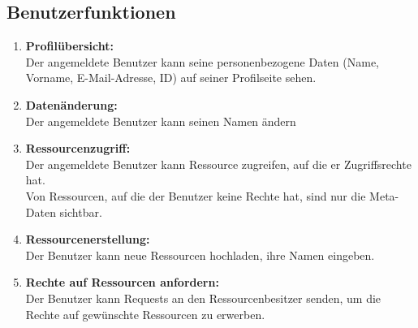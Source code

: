 \documentclass[parskip=full,11pt]{scrartcl}
\def\threedigits#1{%
  \ifnum#1<10 0\fi
  \ifnum#1<1 0\fi
  \number#1}
\begin{document}
\subsection{Benutzerfunktionen}
\begin{enumerate}[label={\textbf{/F\protect\threedigits{\theenumi}0/}}, leftmargin=*]
\item \textbf{Profilübersicht:} \\ Der angemeldete Benutzer kann seine personenbezogene Daten (Name, Vorname, E-Mail-Adresse, ID) auf seiner Profilseite sehen.
\item \textbf{Datenänderung:} \\ Der angemeldete Benutzer kann seinen Namen ändern
\item \textbf{Ressourcenzugriff:} \\Der angemeldete Benutzer kann Ressource zugreifen, auf die er \gls{Zugriffsrechte} hat.
\\ Von Ressourcen, auf die der Benutzer keine Rechte hat, sind nur die Meta-Daten sichtbar.

\item \textbf{Ressourcenerstellung:}\\ Der Benutzer kann neue Ressourcen hochladen, ihre Namen eingeben.
\item \textbf{Rechte auf Ressourcen anfordern:}\\ Der Benutzer kann Requests an den Ressourcenbesitzer senden, um die Rechte auf gewünschte Ressourcen zu erwerben.



\end{enumerate}
\end{document}
